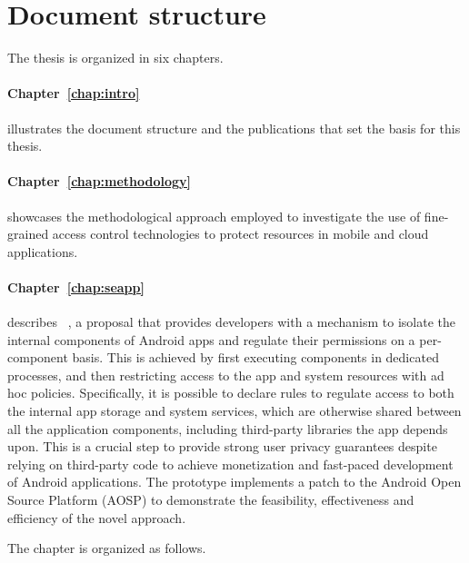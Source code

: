 \section{Document structure}

The thesis is organized in six chapters.

\paragraph*{Chapter~\ref{chap:intro}} illustrates the document
structure and the publications that set the basis for this thesis.

\paragraph*{Chapter~\ref{chap:methodology}} showcases the
methodological approach employed to investigate the use of
fine-grained access control technologies to protect resources in
mobile and cloud applications.

\paragraph*{Chapter~\ref{chap:seapp}} describes \seapp~\cite{seapp}, a
proposal that provides developers with a mechanism to isolate the
internal components of Android apps and regulate their permissions on
a per-component basis. This is achieved by first executing components
in dedicated processes, and then restricting access to the app and
system resources with ad hoc \sel policies. Specifically, it is
possible to declare rules to regulate access to both the internal app
storage and system services, which are otherwise shared between all
the application components, including third-party libraries the app
depends upon. This is a crucial step to provide strong user privacy
guarantees despite relying on third-party code to achieve monetization
and fast-paced development of Android applications. The prototype
implements a patch to the Android Open Source Platform (AOSP) to
demonstrate the feasibility, effectiveness and efficiency of the novel
approach.

\smallskip
\noindent The chapter is organized as follows.

